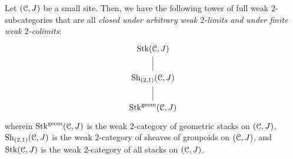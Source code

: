                     \begin{lemma} \label{lemma: geometric_stack_categories}
                        Let $(\mathcal{C}, J)$ be a small site. Then, we have the following tower of full weak $2$-subcategories that are all \textit{closed under arbitrary weak $2$-limits and under finite weak $2$-colimits}:
                            $$
                                \begin{tikzcd}
                                	{\Stk(\C, J)} \\
                                	{\Sh_{(2,1)}(\C, J)} \\
                                	{\Stk^{\geom}(\C, J)}
                                	\arrow[no head, from=3-1, to=2-1]
                                	\arrow[no head, from=2-1, to=1-1]
                                \end{tikzcd}
                            $$
                        wherein $\mathrm{Stk}^{\mathrm{geom}}(\mathcal{C}, J)$ is the weak $2$-category of geometric stacks on $(\mathcal{C}, J)$, $\mathrm{Sh}_{(2,1)}(\mathcal{C}, J)$ is the weak $2$-category of sheaves of groupoids on $(\mathcal{C}, J)$, and $\mathrm{Stk}(\mathcal{C}, J)$ is the weak $2$-category of all stacks on $(\mathcal{C}, J)$. 
                    \end{lemma}
